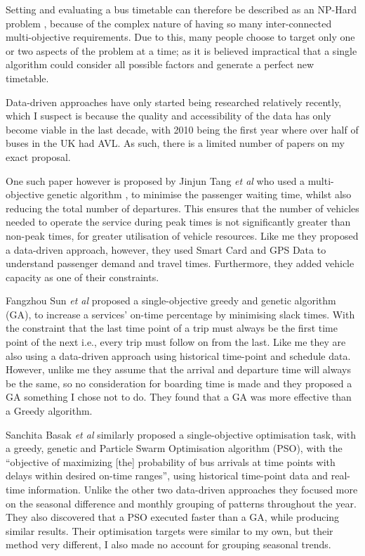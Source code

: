 \documentclass{article}
\begin{document}
\par 
Setting and evaluating a bus timetable can therefore be described as an NP-Hard problem \cite{RN15}, because of the complex nature of having so many inter-connected multi-objective requirements. Due to this, many people choose to target only one or two aspects of the problem at a time; as it is believed impractical that a single algorithm could consider all possible factors and generate a perfect new timetable.


\par
Data-driven approaches have only started being researched relatively recently, which I suspect is because the quality and accessibility of the data has only become viable in the last decade, with 2010 being the first year where over half of buses in the UK had AVL\cite{RN12}. As such, there is a limited number of papers on my exact proposal.

\par
 One such paper however is proposed by Jinjun Tang \textsl{et al} who used a multi-objective genetic algorithm \cite{RN18}, to minimise the passenger waiting time, whilst also reducing the total number of departures. This ensures that the number of vehicles needed to operate the service during peak times is not significantly greater than non-peak times, for greater utilisation of vehicle resources. Like me they proposed a data-driven approach, however, they used Smart Card and GPS Data to understand passenger demand and travel times. Furthermore, they added vehicle capacity as one of their constraints.

\par
Fangzhou Sun \textsl{et al} proposed a single-objective greedy and genetic algorithm (GA)\cite{RN8}, to increase a services' on-time percentage by minimising slack times. With the constraint that the last time point of a trip must always be the first time point of the next i.e., every trip must follow on from the last. Like me they are also using a data-driven approach using historical time-point and schedule data. However, unlike me they assume that the arrival and departure time will always be the same, so no consideration for boarding time is made and they proposed a GA something I chose not to do. They found that a GA was more effective than a Greedy algorithm.  

\par
Sanchita Basak \textsl{et al} similarly proposed a single-objective optimisation task, with a greedy, genetic and Particle Swarm Optimisation algorithm (PSO), with the ``objective of maximizing [the] probability of bus arrivals at time points with delays within desired on-time ranges''\cite{RN7}, using historical time-point data and real-time information. Unlike the other two data-driven approaches they focused more on the seasonal difference and monthly grouping of patterns throughout the year. They also discovered that a PSO executed faster than a GA, while producing similar results. Their optimisation targets were similar to my own, but their method very different, I also made no account for grouping seasonal trends.
\end{document}
